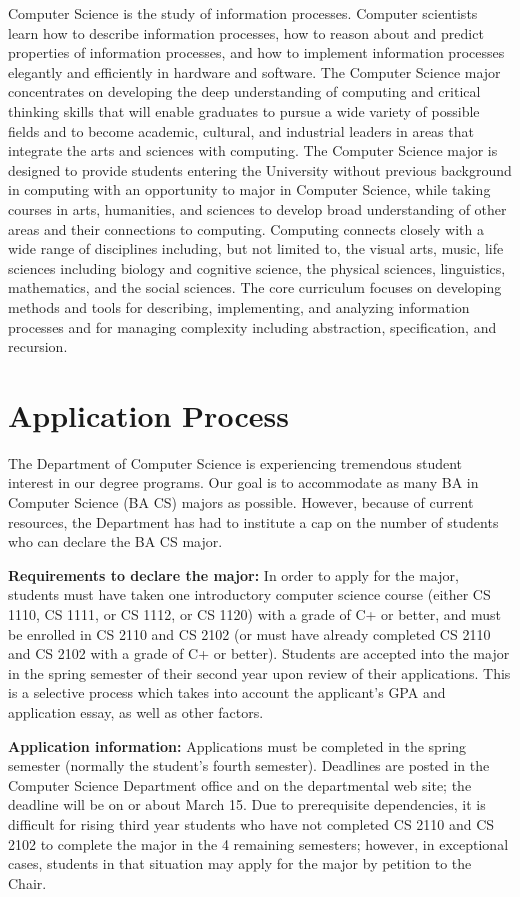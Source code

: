 \documentclass[10pt,letter,twocolumn]{book}
\newcommand{\mysection}[1]{\section{#1}\renewcommand{\rightmark}{#1}}
\begin{document}
Computer Science is the study of information processes. Computer
scientists learn how to describe information processes, how to reason
about and predict properties of information processes, and how to
implement information processes elegantly and efficiently in hardware
and software. The Computer Science major concentrates on developing
the deep understanding of computing and critical thinking skills that
will enable graduates to pursue a wide variety of possible fields and
to become academic, cultural, and industrial leaders in areas that
integrate the arts and sciences with computing. The Computer Science
major is designed to provide students entering the University without
previous background in computing with an opportunity to major in
Computer Science, while taking courses in arts, humanities, and
sciences to develop broad understanding of other areas and their
connections to computing. Computing connects closely with a wide range
of disciplines including, but not limited to, the visual arts, music,
life sciences including biology and cognitive science, the physical
sciences, linguistics, mathematics, and the social sciences. The core
curriculum focuses on developing methods and tools for describing,
implementing, and analyzing information processes and for managing
complexity including abstraction, specification, and recursion. 


\mysection{Application Process}
\label{bacsapplicationprocess}

The Department of Computer Science is experiencing tremendous student
interest in our degree programs. Our goal is to accommodate as many BA
in Computer Science (BA CS) majors as possible.  However, because of
current resources, the Department has had to institute a cap on the
number of students who can declare the BA CS major.


{\bf Requirements to declare the major:} In order to apply for the
major, students must have taken one introductory computer science
course (either CS 1110, CS 1111, or CS 1112, or CS 1120) with a grade
of C+ or better, and must be enrolled in CS 2110 and CS 2102 (or must
have already completed CS 2110 and CS 2102 with a grade of C+ or
better). Students are accepted into the major in the spring semester
of their second year upon review of their applications. This is a
selective process which takes into account the applicant's GPA and
application essay, as well as other factors.

{\bf Application information:} Applications must be completed in the
spring semester (normally the student's fourth semester).  Deadlines
are posted in the Computer Science Department office and on the
departmental web site; the deadline will be on or about March 15.  Due
to prerequisite dependencies, it is difficult for rising third year
students who have not completed CS 2110 and CS 2102 to complete the
major in the 4 remaining semesters; however, in exceptional cases,
students in that situation may apply for the major by petition to the
Chair.
\end{document}
